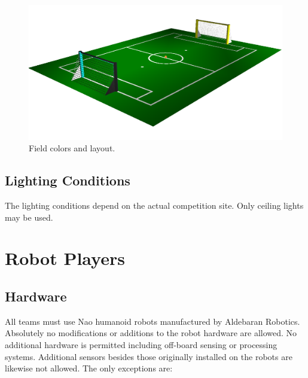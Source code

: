 \documentclass[12pt]{article}
\begin{document}
\begin{figure}[t]
\centerline{\includegraphics[width=\columnwidth]{figs/Nao2009Field-View.png}}
\caption{Field colors and layout.}
\label{fig:field_color}
\end{figure}

\subsection{Lighting Conditions}

The lighting conditions depend on the actual competition site. Only ceiling lights may be used.

\section{Robot Players}

\subsection{Hardware}

All teams must use Nao humanoid robots manufactured by Aldebaran Robotics. Absolutely no modifications or additions to the robot hardware are allowed. No additional hardware is permitted including off-board sensing or processing systems. Additional sensors besides those originally installed on the robots are likewise not allowed. The only exceptions are:
\end{document}
